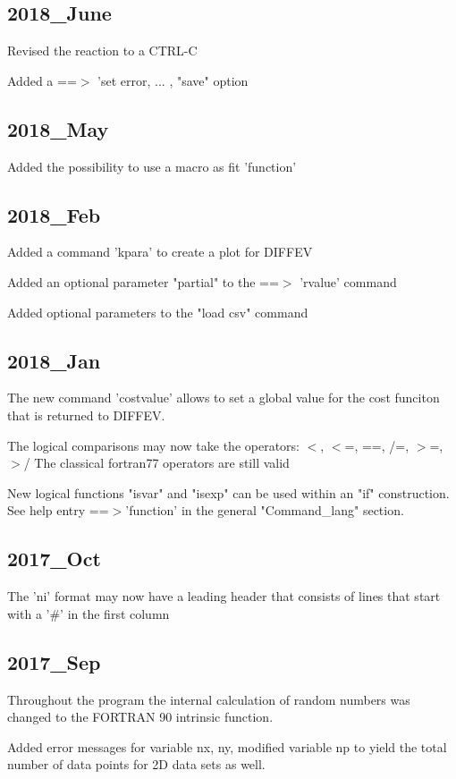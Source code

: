 \subsection*{2018\_June}
\par
Revised the reaction to a CTRL-C 
\par
Added a ==$> $ 'set error, ... , "save" option 
\subsection*{2018\_May}
\par
Added the possibility to use a macro as fit 'function' 
\subsection*{2018\_Feb}
\par
Added a command 'kpara' to create a plot for DIFFEV 
\par
Added an optional parameter "partial" to the ==$> $ 'rvalue' command 
\par
Added optional parameters to the "load csv" command 
\subsection*{2018\_Jan}
\par
The new command 'costvalue' allows to set a global value 
for the cost funciton that is returned to DIFFEV. 
\par
The logical comparisons may now take the operators: 
$ <$, $ <$=, ==, /=, $> $=, $> $/ 
The classical fortran77 operators are still valid 
\par
New logical functions "isvar" and "isexp" can be used within an 
"if" construction. See help entry ==$> $'function' in the 
general "Command\_lang" section. 
\subsection*{2017\_Oct}
\par
The 'ni' format may now have a leading header that consists of 
lines that start with a '\#' in the first column 
\subsection*{2017\_Sep}
\par
Throughout the program the internal calculation of random numbers 
was changed to the FORTRAN 90 intrinsic function. 
\par
Added error messages for variable nx, ny, modified variable np to 
yield the total number of data points for 2D data sets as well. 

